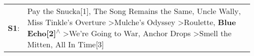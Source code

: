 \begin{supertabular}{p{0.03\textwidth}p{0.92\textwidth}}
 \textbf{S1}:  &  Pay the Snucka[1]\textsuperscript{}, \enspace The Song Remains the Same\textsuperscript{}, \enspace Uncle Wally\textsuperscript{}, \enspace Miss Tinkle's Overture\textsuperscript{} \textgreater \enspace Mulche's Odyssey\textsuperscript{} \textgreater \enspace Roulette\textsuperscript{}, \enspace \textbf{Blue Echo[2]\textsuperscript{$\wedge$}} \textgreater \enspace We're Going to War\textsuperscript{}, \enspace Anchor Drops\textsuperscript{} \textgreater \enspace Smell the Mitten\textsuperscript{}, \enspace All In Time[3]\textsuperscript{}  \enspace  \\
\end{supertabular}
